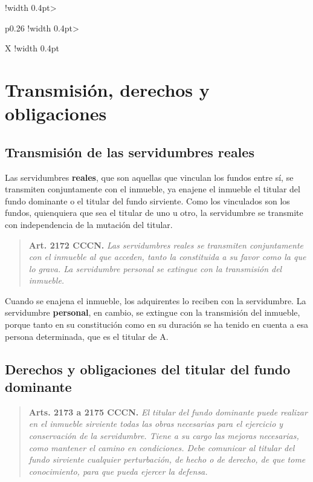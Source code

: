 \documentclass[12pt,oneside]{book}
\begin{document}
\begin{table}[H]
\begin{tabularx}{\textwidth}{
    !{\vrule width 0.4pt}>{\raggedright\arraybackslash}p{0.26\textwidth}
    !{\vrule width 0.4pt}>{\raggedright\arraybackslash}X
    !{\vrule width 0.4pt}
}
\bottomrule
\end{tabularx}
\end{table}

\chapter[Transmisión, derechos y obligaciones]{Transmisión, derechos y obligaciones}

\section{Transmisión de las servidumbres reales}

Las servidumbres \textbf{reales}, que son aquellas que vinculan los fundos entre sí, se transmiten conjuntamente con el inmueble, ya enajene el inmueble el titular del fundo dominante o el titular del fundo sirviente. Como los vinculados son los fundos, quienquiera que sea el titular de uno u otro, la servidumbre se transmite con independencia de la mutación del titular.

\begin{quote}
\textbf{Art. 2172 CCCN.} \textit{Las servidumbres reales se transmiten conjuntamente con el inmueble al que acceden, tanto la constituida a su favor como la que lo grava. La servidumbre personal se extingue con la transmisión del inmueble.}
\end{quote}

Cuando se enajena el inmueble, los adquirentes lo reciben con la servidumbre. La servidumbre \textbf{personal}, en cambio, se extingue con la transmisión del inmueble, porque tanto en su constitución como en su duración se ha tenido en cuenta a esa persona determinada, que es el titular de A.

\section{Derechos y obligaciones del titular del fundo dominante}

\begin{quote}
\textbf{Arts. 2173 a 2175 CCCN.} \textit{El titular del fundo dominante puede realizar en el inmueble sirviente todas las obras necesarias para el ejercicio y conservación de la servidumbre. Tiene a su cargo las mejoras necesarias, como mantener el camino en condiciones. Debe comunicar al titular del fundo sirviente cualquier perturbación, de hecho o de derecho, de que tome conocimiento, para que pueda ejercer la defensa.}
\end{quote}
\end{document}
